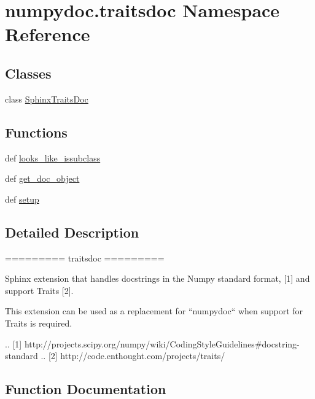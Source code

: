 \hypertarget{namespacenumpydoc_1_1traitsdoc}{}\section{numpydoc.\+traitsdoc Namespace Reference}
\label{namespacenumpydoc_1_1traitsdoc}
\subsection*{Classes}
\begin{DoxyCompactItemize}
\item 
class \hyperlink{classnumpydoc_1_1traitsdoc_1_1SphinxTraitsDoc}{Sphinx\+Traits\+Doc}
\end{DoxyCompactItemize}
\subsection*{Functions}
\begin{DoxyCompactItemize}
\item 
def \hyperlink{namespacenumpydoc_1_1traitsdoc_ade10b629f87ea7612bd4c2b796f4db4c}{looks\+\_\+like\+\_\+issubclass}
\item 
def \hyperlink{namespacenumpydoc_1_1traitsdoc_abf531e02557b9f9a9de64ff39a306076}{get\+\_\+doc\+\_\+object}
\item 
def \hyperlink{namespacenumpydoc_1_1traitsdoc_a8e84d24fac4da2ef8e737cb01859508e}{setup}
\end{DoxyCompactItemize}


\subsection{Detailed Description}
\begin{DoxyVerb}=========
traitsdoc
=========

Sphinx extension that handles docstrings in the Numpy standard format, [1]
and support Traits [2].

This extension can be used as a replacement for ``numpydoc`` when support
for Traits is required.

.. [1] http://projects.scipy.org/numpy/wiki/CodingStyleGuidelines#docstring-standard
.. [2] http://code.enthought.com/projects/traits/\end{DoxyVerb}
 

\subsection{Function Documentation}
\hypertarget{namespacenumpydoc_1_1traitsdoc_abf531e02557b9f9a9de64ff39a306076}{}
